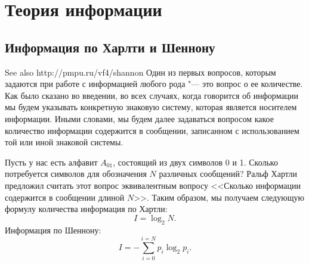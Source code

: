 \documentclass[b5paper,11pt]{book}
\begin{document}
	
	\chapter{Теория информации}
	
	\section{Информация по Харлти и Шеннону}
	See also http://pmpu.ru/vf4/shannon
	Один из первых вопросов, которым задаются при работе с информацией любого рода "--- это вопрос о ее количестве. Как было сказано во введении, во всех случаях, когда говорится об информации мы будем указывать конкретную знаковую систему, которая является носителем информации. Иными словами, мы будем далее задаваться вопросом какое количество информации содержится в сообщении, записанном с использованием той или иной знаковой системы.
	
	Пусть у нас есть алфавит $A_{01}$, состоящий из двух символов 0 и 1. Сколько потребуется символов для обозначения $N$ различных сообщений? Ральф Хартли предложил считать этот вопрос эквивалентным вопросу <<Сколько информации содержится в сообщении длиной $N$>>. Таким образом, мы получаем следующую формулу количества информация по Хартли:
	\begin{equation}
		I = \log_2N.
	\end{equation}
	Информация по Шеннону:
	\begin{equation}
		I = -\sum_{i=0}^{i=N} p_i\log_2p_i.
	\end{equation}
\end{document}
